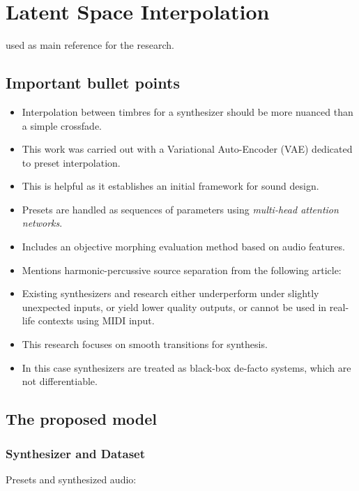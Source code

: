 \section{Latent Space Interpolation}

\cite{latentSpaceInterpolation} used as main reference for the research.

\subsection{Important bullet points}

\begin{itemize}
    \item Interpolation between timbres for a synthesizer should be more nuanced than a simple crossfade.
    \item This work was carried out with a Variational Auto-Encoder (VAE) dedicated to preset interpolation.
    \item This is helpful as it establishes an initial framework for sound design.
    \item Presets are handled as sequences of parameters using \textit{multi-head attention networks}.
    \item Includes an objective morphing evaluation method based on audio features.
    \item Mentions harmonic-percussive source separation from the following article: \cite{Harmonic_Percussive_Separation}
    \item Existing synthesizers and research either underperform under slightly unexpected inputs, or yield lower quality outputs, or cannot be used in real-life contexts using MIDI input.
    \item This research focuses on smooth transitions for synthesis.
    \item In this case synthesizers are treated as black-box de-facto systems, which are not differentiable.
\end{itemize}

\subsection{The proposed model}

\subsubsection{Synthesizer and Dataset}

Presets and synthesized audio:

